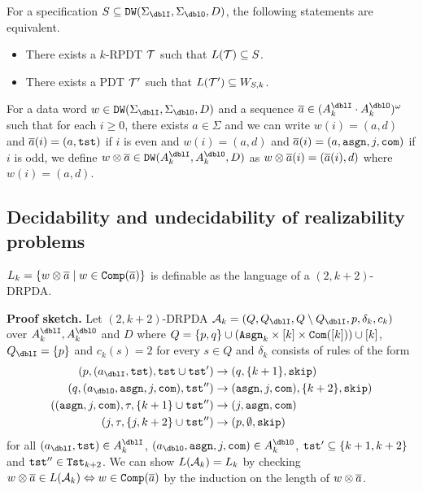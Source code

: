 \begin{theorem}\label{the: finite_actions}
For a specification $S\subseteq \DW(\Sigma_\dblI,\Sigma_\dblO,D)$, the following statements are equivalent.
\begin{itemize}
\item There exists a $k$-RPDT ${\cal T}$ such that $L({\cal T})\subseteq S$.
\item There exists a PDT ${\cal T}'$ such that $L({\cal T}')\subseteq W_{S,k}$.
\end{itemize}
\end{theorem}

For a data word
$w\in\DW(\Sigma_\dblI,\Sigma_\dblO,D)$ and
a sequence $\overa\in(A_k^\dblI\cdot A_k^\dblO)^\omega$
such that
for each $i\geq 0$, there exists
$a\in\Sigma$
and we can write
$w(i)=(a,d)$ and ${\overline{a}}(i)=(a,\mathtt{tst})$ if $i$ is even
and
$w(i)=(a,d)$ and ${\overline{a}}(i)=(a,\mathtt{asgn},j,\mathtt{com})$ if $i$ is odd,
we define $w\otimes\overa\in\DW(A_k^\dblI,A_k^\dblO,D)$ as
$w\otimes{\overline{a}}(i)=({\overline{a}}(i), d)$ where $w(i)=(a,d)$.


\subsection{Decidability and undecidability of realizability problems}
\begin{lemma}\label{lem: Lk}
$L_k = \{w\otimes{\overline{a}} \mid w\in{\mathtt{Comp}}({\overline{a}})\}$ is definable as the language of a $(2,k+2)$-DRPDA.
\end{lemma}
{\bf Proof sketch.}\quad
Let $(2,k+2)$-DRPDA
$\calA_k = (Q, Q_\dblI, Q\setminus Q_\dblI, p, \delta_k, c_k)$ over $A_k^\dblI, A_k^\dblO$ and $D$ where
$Q=\{p, q\}\cup(\mathtt{Asgn}_k\times[k]\times\mathtt{Com}([k]))\cup[k]$, $Q_\dblI=\{p\}$
and $c_k(s)=2$ for every $s\in Q$ and $\delta_k$ consists of rules of the form
\begin{align}
(p, (a_\dblI, \tst), \tst\cup\tst')&\to(q, \{k+1\}, \skip)\label{eq: Lk1}\\
(q, (a_\dblO, \asgn, j, \com), \tst'')&\to(\asgn,j,\com), \{k+2\},\skip)\label{eq: Lk2}\\
((\asgn,j,\com), \tau, \{k+1\}\cup\tst'')&\to(j, \asgn, \com)\label{eq: Lk3}\\
(j, \tau, \{j, k+2\}\cup\tst'')&\to(p, \emptyset, \skip)\label{eq: Lk4}
\end{align}
for all $(a_\dblI, \tst)\in A_k^\dblI$, $(a_\dblO, \asgn, j, \com)\in A_k^\dblO$, $\mathtt{tst}'\subseteq \{k+1,k+2\}$ and $\mathtt{tst}''\in\mathtt{Tst}_{k+2}$.
We can show $L({\cal A}_k)=L_k$
by checking $w\otimes{\overline{a}} \in L({\cal A}_k)\Leftrightarrow
w\in{\mathtt{Comp}}({\overline{a}})$ by the induction on the length of $w\otimes{\overline{a}}$.

